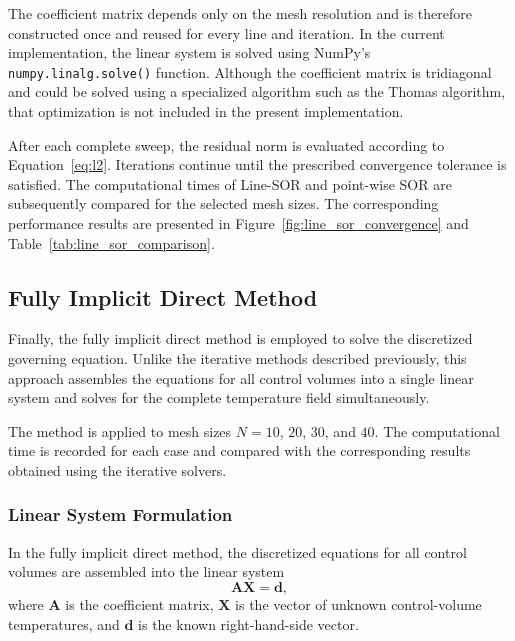 The coefficient matrix depends only on the mesh resolution and is therefore constructed once and reused for every line and iteration. In the current implementation, the linear system is solved using NumPy's \texttt{numpy.linalg.solve()} function. Although the coefficient matrix is tridiagonal and could be solved using a specialized algorithm such as the Thomas algorithm, that optimization is not included in the present implementation.

After each complete sweep, the residual norm is evaluated according to Equation~\ref{eq:l2}. Iterations continue until the prescribed convergence tolerance is satisfied. The computational times of Line-SOR and point-wise SOR are subsequently compared for the selected mesh sizes. The corresponding performance results are presented in Figure~\ref{fig:line_sor_convergence} and Table~\ref{tab:line_sor_comparison}.



\subsection{Fully Implicit Direct Method}

Finally, the fully implicit direct method is employed to solve the discretized governing equation. Unlike the iterative methods described previously, this approach assembles the equations for all control volumes into a single linear system and solves for the complete temperature field simultaneously.

The method is applied to mesh sizes $N=10$, $20$, $30$, and $40$. The computational time is recorded for each case and compared with the corresponding results obtained using the iterative solvers.


\subsubsection{Linear System Formulation}

In the fully implicit direct method, the discretized equations for all control volumes are assembled into the linear system
\begin{equation}
\mathbf{A}\mathbf{X}=\mathbf{d},
\label{eq:implicit_system}
\end{equation}
where $\mathbf{A}$ is the coefficient matrix, $\mathbf{X}$ is the vector of unknown control-volume temperatures, and $\mathbf{d}$ is the known right-hand-side vector.

